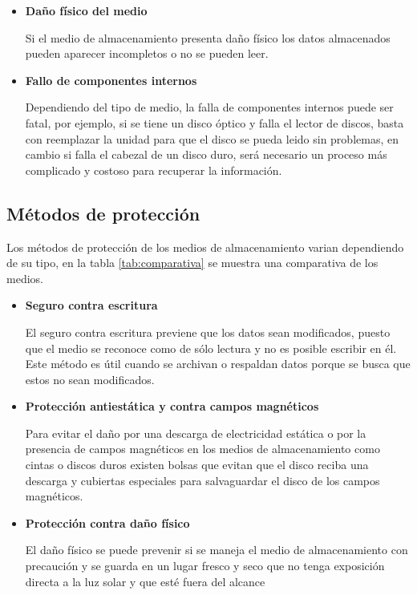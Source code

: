     \begin{itemize}

      \item \textbf{Da\~{n}o f\'{i}sico del medio}

Si el medio de almacenamiento presenta da\~{n}o f\'{i}sico los datos almacenados pueden aparecer incompletos o no se pueden leer.


      \item \textbf{Fallo de componentes internos}

Dependiendo del tipo de medio, la falla de componentes internos puede ser fatal, por ejemplo, si se tiene un disco \'{o}ptico y falla el lector de discos, basta con reemplazar la unidad para que el disco se pueda leido sin problemas, en cambio si falla el cabezal de un disco duro, ser\'{a} necesario un proceso m\'{a}s complicado y costoso para recuperar la informaci\'{o}n.


    \end{itemize}

  \subsection {M\'{e}todos de protecci\'{o}n}

Los m\'{e}todos de protecci\'{o}n de los medios de almacenamiento varian dependiendo de su tipo, en la tabla \ref{tab:comparativa} se muestra una comparativa de los medios.

    \begin{itemize}

      \item \textbf{Seguro contra escritura}
        
El seguro contra escritura previene que los datos sean modificados, puesto que el medio se reconoce como de s\'{o}lo lectura y no es posible escribir en \'{e}l. Este m\'{e}todo es \'{u}til cuando se archivan o respaldan datos porque se busca que estos no sean modificados.

      \item \textbf{Protecci\'{o}n antiest\'{a}tica y contra campos magn\'{e}ticos}
        
Para evitar el da\~{n}o por una descarga de electricidad est\'{a}tica o por la presencia de campos magn\'{e}ticos en los medios de almacenamiento como cintas o discos duros existen bolsas que evitan que el disco reciba una descarga y cubiertas especiales para salvaguardar el disco de los campos magn\'{e}ticos.

      \item \textbf{Protecci\'{o}n contra da\~{n}o f\'{i}sico}
       
El da\~{n}o f\'{i}sico se puede prevenir si se maneja el medio de almacenamiento con precauci\'{o}n y se guarda en un lugar fresco y seco que no tenga exposici\'{o}n directa a la luz solar y que est\'{e} fuera del alcance 

    \end{itemize}

